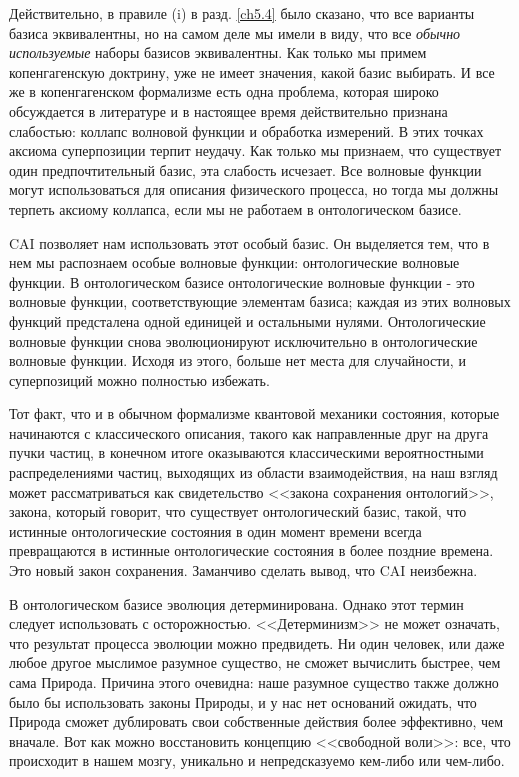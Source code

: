 \documentclass[main.tex]{subfiles}
\begin{document}
Действительно, в правиле (i) в разд. \ref{ch5.4} было сказано, что все варианты базиса эквивалентны, но на самом деле мы имели в виду, что все \textit{обычно используемые}  наборы базисов эквивалентны. Как только мы примем копенгагенскую доктрину, уже не имеет значения, какой базис выбирать. И все же в копенгагенском формализме есть одна проблема, которая широко обсуждается в литературе и в настоящее время действительно признана слабостью: коллапс волновой функции и обработка измерений. В этих точках аксиома суперпозиции терпит неудачу. Как только мы признаем, что существует один предпочтительный базис, эта слабость исчезает. Все волновые функции могут использоваться для описания физического процесса, но тогда мы должны терпеть аксиому коллапса, если мы не работаем в онтологическом базисе.

CAI позволяет нам использовать этот особый базис. Он выделяется тем, что в нем мы распознаем особые волновые функции: онтологические волновые функции. В онтологическом базисе онтологические волновые функции - это волновые функции, соответствующие элементам базиса; каждая из этих волновых функций предсталена одной единицей и остальными нулями. Онтологические волновые функции снова эволюционируют исключительно в онтологические волновые функции. Исходя из этого, больше нет места для случайности, и суперпозиций можно полностью избежать.

Тот факт, что и в обычном формализме квантовой механики состояния, которые начинаются с классического описания, такого как направленные друг на друга пучки частиц, в конечном итоге оказываются классическими вероятностными распределениями частиц, выходящих из области взаимодействия, на наш взгляд может рассматриваться как свидетельство <<закона сохранения онтологий>>, закона, который говорит, что существует онтологический базис, такой, что истинные онтологические состояния в один момент времени всегда превращаются в истинные онтологические состояния в более поздние времена. Это новый закон сохранения. Заманчиво сделать вывод, что CAI неизбежна.

В онтологическом базисе эволюция детерминирована. Однако этот термин следует использовать с осторожностью. <<Детерминизм>> не может означать, что результат процесса эволюции можно предвидеть. Ни один человек, или даже любое другое мыслимое разумное существо, не сможет вычислить быстрее, чем сама Природа. Причина этого очевидна: наше разумное существо также должно было бы использовать законы Природы, и у нас нет оснований ожидать, что Природа сможет дублировать свои собственные действия более эффективно, чем вначале. Вот как можно восстановить концепцию <<свободной воли>>: все, что происходит в нашем мозгу, уникально и непредсказуемо кем-либо или чем-либо.
\end{document}
